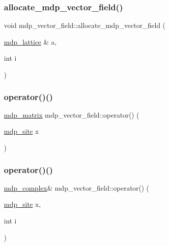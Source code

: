 \subsubsection{\texorpdfstring{allocate\+\_\+mdp\+\_\+vector\+\_\+field()}{allocate\_mdp\_vector\_field()}}
{\footnotesize\ttfamily void mdp\+\_\+vector\+\_\+field\+::allocate\+\_\+mdp\+\_\+vector\+\_\+field (\begin{DoxyParamCaption}\item[{\hyperlink{classmdp__lattice}{mdp\+\_\+lattice} \&}]{a,  }\item[{int}]{i }\end{DoxyParamCaption})\hspace{0.3cm}{\ttfamily [inline]}}

\mbox{\label{classmdp__vector__field_aaa674fa7253c69257ca593d3854d1672}} 
\subsubsection{\texorpdfstring{operator()()}{operator()()}\hspace{0.1cm}{\footnotesize\ttfamily [1/3]}}
{\footnotesize\ttfamily \hyperlink{classmdp__matrix}{mdp\+\_\+matrix} mdp\+\_\+vector\+\_\+field\+::operator() (\begin{DoxyParamCaption}\item[{\hyperlink{classmdp__site}{mdp\+\_\+site}}]{x }\end{DoxyParamCaption})\hspace{0.3cm}{\ttfamily [inline]}}

\mbox{\label{classmdp__vector__field_aa50ba6cb67e5978d0e362b70ea703164}} 
\subsubsection{\texorpdfstring{operator()()}{operator()()}\hspace{0.1cm}{\footnotesize\ttfamily [2/3]}}
{\footnotesize\ttfamily \hyperlink{classmdp__complex}{mdp\+\_\+complex}\& mdp\+\_\+vector\+\_\+field\+::operator() (\begin{DoxyParamCaption}\item[{\hyperlink{classmdp__site}{mdp\+\_\+site}}]{x,  }\item[{int}]{i }\end{DoxyParamCaption})\hspace{0.3cm}{\ttfamily [inline]}}

